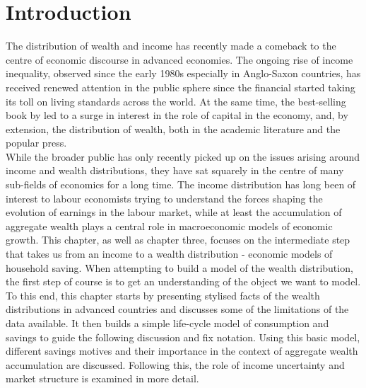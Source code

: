 \section{Introduction}

The distribution of wealth and income has recently made a comeback to the
centre of economic discourse in advanced economies. The ongoing rise of
income inequality, observed since the early 1980s especially in Anglo-Saxon
countries, has received renewed attention in the public sphere since the
financial started taking its toll on living standards across the world. At
the same time, the best-selling book by \citet{Piketty2014} led to a surge
in interest in the role of capital in the economy, and, by extension, the
distribution of wealth, both in the academic literature and the popular
press. \\
While the broader public has only recently picked up on the issues arising
around income and wealth distributions, they have sat squarely in the centre
of many sub-fields of economics for a long time. The income distribution has
long been of interest to labour economists trying to understand the forces
shaping the evolution of earnings in the labour market, while at least the
accumulation of aggregate wealth plays a central role in macroeconomic
models of economic growth. This chapter, as well as chapter three, 
focuses on the intermediate step that takes us from an
income to a wealth distribution - economic models of household saving.
When attempting to build a model of the wealth distribution, the first
step of course is to get an understanding of the object we want to model.
To this end, this chapter starts by presenting stylised facts of the wealth
distributions in advanced countries and discusses some of the limitations
of the data available. It then builds a simple life-cycle model of consumption
and savings to guide the following discussion and fix notation. Using this
basic model, different savings motives and their importance in the context
of aggregate wealth accumulation are discussed. Following this, the role of
income uncertainty and market structure is examined in more detail.


